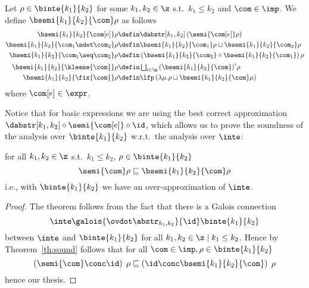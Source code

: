 \begin{definition}\label{def:boundedanalysis}
  Let \(\rho \in \binte{k_1}{k_2}\) for some \(k_1, k_2 \in \z\) s.t.\
  \(k_1 \leq k_2\) and \(\com \in \imp\). We define
  \(\bsemi{k_1}{k_2}{\com}\rho\) as follows
  \begin{align*}
    \bsemi{k_1}{k_2}{\com[e]}\rho & \defin \dabstr[k_1,k_2] \left(\semi{\com[e]}\rho\right) \\
    \bsemi{k_1}{k_2}{\com_1 \ndet \com_2}\rho & \defin \bsemi{k_1}{k_2}{\com_1}\rho \sqcup \bsemi{k_1}{k_2}{\com_2}\rho \\
    \bsemi{k_1}{k_2}{\com_1 \seq \com_2}\rho & \defin \left(\bsemi{k_1}{k_2}{\com_2} \circ \bsemi{k_1}{k_2}{\com_1}\right)\rho \\
    \bsemi{k_1}{k_2}{\kleene{\com}}\rho & \defin \textstyle\bigsqcup_{i\in\n}{\left({\bsemi{k_1}{k_2}{\com}}\right)}^i\rho \\
    \bsemi{k_1}{k_2}{\fix{\com}}\rho & \defin \lfp\left(\lambda \mu . \rho \sqcup \bsemi{k_1}{k_2}{\com}\mu\right)
  \end{align*}
  where \(\com[e]\in\expr\). 
\end{definition}
\noindent
Notice that for basic expressions we are using the best correct
approximation \(\dabstr[k_1,k_2] \circ \semi{\com[e]} \circ \id\),
which allows us to prove the soundness of the analysis over
\(\binte{k_1}{k_2}\) w.r.t.\ the analysis over \(\inte\):
\begin{lemma}\label{le:leq}
  for all \(k_1, k_2\in\z\) s.t.\ \(k_1 \leq k_2\),
  \(\rho \in \binte{k_1}{k_2}\)
  \begin{equation*}
    \semi{\com}\rho \sqsubseteq \bsemi{k_1}{k_2}{\com}\rho
  \end{equation*}
  i.e., with \(\binte{k_1}{k_2}\) we have an over-approximation of \(\inte\).
\end{lemma}

\begin{proof}
  The theorem follows from the fact that there is a Galois connection
  \begin{equation*}
    \inte\galois{\ovdot\abstr_{k_1, k_2}}{\id}\binte{k_1}{k_2}
  \end{equation*}
  between \(\inte\) and \(\binte{k_1}{k_2}\) for all
  \(k_1, k_2 \in \z \mid k_1 \leq k_2\). Hence by
  Theorem~\ref{th:sound} follows that for all
  \(\com\in\imp, \rho \in \binte{k_1}{k_2}\)
  \begin{equation*}
    \left(\semi{\com} \conc \id \right)\;\rho \sqsubseteq  \left(\id \conc \bsemi{k_1}{k_2}{\com}\right)\;\rho
  \end{equation*}
  hence our thesis.
\end{proof}

